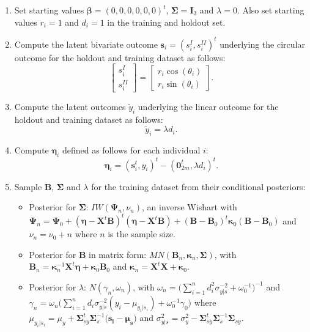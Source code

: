 \documentclass[12pt,]{article}
\begin{document}
\begin{enumerate}
\item Set starting values $\boldsymbol{\beta} = (0,0,0,0,0,0)^t$, $\boldsymbol{\Sigma} = \boldsymbol{I}_3$ and $\lambda = 0$. Also set starting values $r_i = 1$ and $d_i = 1$ in the training and holdout set. 
\item Compute the latent bivariate outcome $\boldsymbol{s}_i = (s_i^{I}, s_i^{II})^t$ underlying the circular outcome for the holdout and training dataset as follows:
$$\begin{bmatrix} s^{I}_{i} \\ s^{II}_{i} \end{bmatrix} = \begin{bmatrix} r_i \cos (\theta_i) \\  r_i\sin (\theta_i)\end{bmatrix}.$$
\item Compute the latent outcomes $\tilde{y}_i$ underlying the linear outcome for the holdout and training dataset as follows:
$$\tilde{y}_i = \lambda d_i. $$
\item Compute $\boldsymbol{\eta}_i$ defined as follows for each individual $i$:
$$\boldsymbol{\eta}_i = (\boldsymbol{s}_i^t,y_i)^t - (\boldsymbol{0}_{2m}^t, \lambda d_i)^{t}.$$

\item Sample $\boldsymbol{B}$, $\boldsymbol{\Sigma}$ and $\lambda$ for the training dataset from their conditional posteriors: 

\begin{itemize}
\item Posterior for $\boldsymbol{\Sigma}$: $IW(\boldsymbol{\Psi}_n, \nu_n)$, an inverse Wishart with $\boldsymbol{\Psi}_n = \boldsymbol{\Psi}_0 + (\boldsymbol{\eta} - \boldsymbol{X}^t\boldsymbol{B})^t(\boldsymbol{\eta} - \boldsymbol{X}^t\boldsymbol{B}) + (\boldsymbol{B} - \boldsymbol{B}_0)^t\boldsymbol{\kappa}_0(\boldsymbol{B} - \boldsymbol{B}_0)$ and $\nu_n = \nu_0 + n$ where $n$ is the sample size.
\item Posterior for $\boldsymbol{B}$ in matrix form: $MN(\boldsymbol{B}_n,   \boldsymbol{\kappa}_n, \boldsymbol{\Sigma})$, with $\boldsymbol{B}_n = \boldsymbol{\kappa}_n^{-1}\boldsymbol{X}^t\boldsymbol{\eta} + \boldsymbol{\kappa}_0\boldsymbol{B}_0$ and $\boldsymbol{\kappa}_n = \boldsymbol{X}^t\boldsymbol{X} + \boldsymbol{\kappa}_0$.
\item Posterior for $\lambda$: $N(\gamma_n, \omega_n)$, with $\omega_n = \big(\sum_{i = 1}^{n}d_i^2\sigma^{-2}_{y|s} + \omega_0^{-1}\big)^{-1}$ and $\gamma_n = \omega_n \big(\sum_{i = 1}^{n}d_i\sigma^{-2}_{y|s}(y_i - \mu_{y_i|s_i}) + \omega_0^{-1}\gamma_0 \big)$ where $\mu_{y_i|s_i} = \mu_y + \boldsymbol{\Sigma}_{sy}^{t}\boldsymbol{\Sigma}_{s}^{-1}(\boldsymbol{s_i - \boldsymbol{\mu}_s)}$ and $\sigma^2_{y|s} = \sigma^2_{y} - \boldsymbol{\Sigma}_{sy}^{t}\boldsymbol{\Sigma}_{s}^{-1}\boldsymbol{\Sigma}_{sy}$.
\end{itemize}


\end{enumerate}
\end{document}
